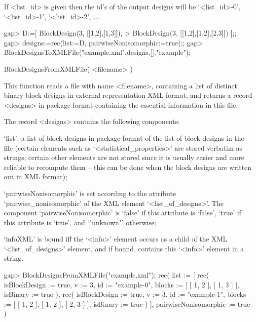If <list_id> is given then the id's of the output designs will be
`<list_id>-0', `<list_id>-1', `<list_id>-2', ...

\beginexample
gap> D:=[ BlockDesign(3, [[1,2],[1,3]]),                        
>         BlockDesign(3, [[1,2],[1,2],[2,3]]) ];;
gap> designs:=rec(list:=D, pairwiseNonisomorphic:=true);;
gap> BlockDesignsToXMLFile("example.xml",designs,[],"example"); 
\endexample


\>BlockDesignsFromXMLFile( <filename> )

This function reads a file with name <filename>, containing a list of
distinct binary block designs in external representation XML-format,
and returns a record  <designs> in {\DESIGN} package format containing
the essential information in this file.

The record <designs> contains the following components:

`list': a list of block designs in {\DESIGN} package format of
the list of block designs in the file (certain elements such as
`<statistical_properties>' are stored verbatim as strings; certain other
elements are not stored since it is usually easier and more reliable to
recompute them -- this can be done when the block designs are written
out in XML format);

`pairwiseNonisomorphic' is set according to the attribute
`pairwise_nonisomorphic' of the XML element `<list_of_designs>'.
The component `pairwiseNonisomorphic' is `false' if this attribute
is `false', `true' if this attribute is `true', and `"unknown"' otherwise;

`infoXML' is bound iff the `<info>' element occurs as a child of the
XML `<list_of_designs>' element, and if bound, contains this `<info>'
element in a string.

\beginexample
gap> BlockDesignsFromXMLFile("example.xml");
rec( 
  list := [ rec( isBlockDesign := true, v := 3, id := "example-0", blocks := 
            [ [ 1, 2 ], [ 1, 3 ] ], isBinary := true ), 
      rec( isBlockDesign := true, v := 3, id := "example-1", 
          blocks := [ [ 1, 2 ], [ 1, 2 ], [ 2, 3 ] ], isBinary := true ) ], 
  pairwiseNonisomorphic := true )
\endexample

